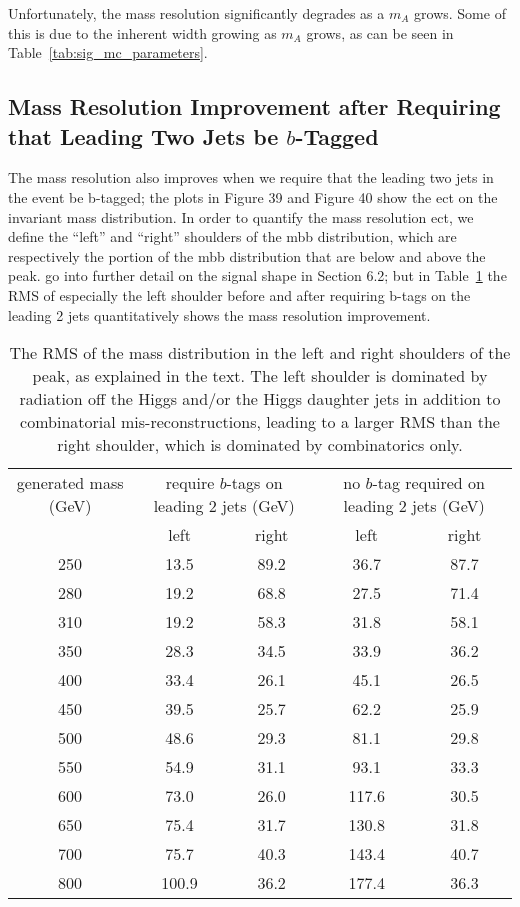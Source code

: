 Unfortunately, the mass resolution significantly degrades as a $m_A$ grows.  Some of this is due to the inherent width growing as $m_A$ grows, as can be seen in Table~\ref{tab:sig_mc_parameters}.  

\subsection{Mass Resolution Improvement after Requiring that Leading Two Jets be $b$-Tagged}
The mass resolution also improves when we require that the leading two jets in the event be b-tagged;
 the plots in Figure 39 and Figure 40 show the ect on the invariant mass distribution.
 In order to quantify the mass resolution ect, we define the “left” and “right” shoulders of the mbb
 distribution, which are respectively the portion of the mbb distribution that are below and above the peak.
 go into further detail on the signal shape in Section 6.2; but in Table~\ref{tab:signal_mass_RMS_compare} the RMS of especially the left
 shoulder before and after requiring b-tags on the leading 2 jets quantitatively shows the mass resolution
 improvement.



\begin{table}
\centering
\caption{The RMS of the mass distribution in the left and right shoulders of the peak,
    as explained in the text.  The left shoulder is dominated by radiation off the Higgs
    and/or the Higgs daughter jets in addition to combinatorial mis-reconstructions,
    leading to a larger RMS than the right shoulder, which
    is dominated by combinatorics only.\label{tab:signal_mass_RMS_compare}   }
  \begin{tabular}{ccccc}
     \hline \hline
     generated mass (GeV) & \multicolumn{2}{c}{require $b$-tags on leading 2 jets (GeV)} & \multicolumn{2}{c}{no $b$-tag required on leading 2 jets (GeV)}  \\
        & left & right & left & right \\ \hline
     250 & 13.5 & 89.2 & 36.7 & 87.7 \\
     280 & 19.2 & 68.8 & 27.5 & 71.4 \\
     310 & 19.2 & 58.3 & 31.8 & 58.1 \\
     350 & 28.3 & 34.5 & 33.9 & 36.2 \\
     400 & 33.4 & 26.1 & 45.1 & 26.5 \\
     450 & 39.5 & 25.7 & 62.2 & 25.9 \\
     500 & 48.6 & 29.3 & 81.1 & 29.8 \\
     550 & 54.9 & 31.1 & 93.1 & 33.3 \\
     600 & 73.0 & 26.0 & 117.6 & 30.5 \\
     650 & 75.4 & 31.7 & 130.8 & 31.8 \\
     700 & 75.7 & 40.3 & 143.4 & 40.7 \\
     800 & 100.9 & 36.2 & 177.4 & 36.3 \\
     \hline     \end{tabular}
\end{table}






